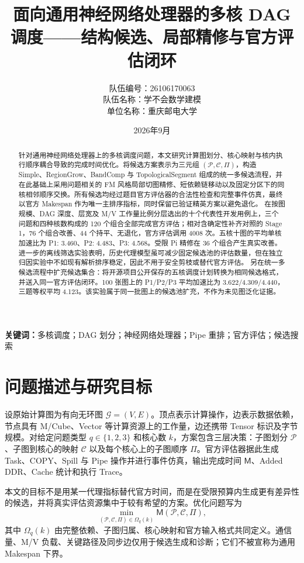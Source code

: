 \documentclass[UTF8,a4paper,11pt]{ctexart}
\title{面向通用神经网络处理器的多核 DAG 调度\quad——结构候选、局部精修与官方评估闭环}
\author{\begin{tabular}{rl}
队伍编号：&26106170063\\
队伍名称：&学不会数学建模\\
单位名称：&重庆邮电大学
\end{tabular}}
\date{2026年9月}
\newcommand{\Makespan}{\mathsf{M}}
\newcommand{\DAG}{\mathcal{G}}
\newcommand{\PP}{\mathcal{P}}
\newcommand{\CC}{\mathcal{C}}
\newcommand{\PiOrder}{\Pi}
\begin{document}
\maketitle
\begin{abstract}
针对通用神经网络处理器上的多核调度问题，本文研究计算图划分、核心映射与核内执行顺序耦合导致的完成时间优化。将候选方案表示为三元组 $(\PP,\CC,\PiOrder)$，构造 Simple、RegionGrow、BandComp 与 TopologicalSegment 组成的统一多候选流程，并在此基础上采用问题相关的 FM 风格局部切图精修、短依赖链移动以及固定分区下的同核相邻顺序交换。所有候选均经过题目官方评估器的合法性检查和完整事件仿真，最终以官方 Makespan 作为唯一主排序指标，同时保留已验证精英方案以避免退化。
在按图规模、DAG 深度、层宽及 M/V 工作量比例分层选出的十个代表性开发用例上，三个问题和四种核数构成的 120 个组合全部完成官方评估；相对含确定性补齐对照的 Stage 1，76 个组合改善、44 个持平、无退化，官方评估调用 4008 次。五核十图的平均单核加速比为 P1: 3.460、P2: 4.483、P3: 4.568。受限 Pi 精修在 36 个组合产生真实改善。进一步的离线筛选实验表明，历史代理模型虽可减少固定候选池的评估数量，但在独立归因实验中不如现有解析排序稳定，因此不用于安全剪枝或替代官方评估。
另在统一多候选流程中扩充候选集合：将开源项目公开保存的五核调度计划转换为相同候选格式，并送入同一官方评估闭环。100 张图上的 P1/P2/P3 平均加速比为 3.622/4.309/4.440，三题等权平均 4.123。该实验属于同一批图上的候选池扩充，不作为未见图泛化证据。
\end{abstract}
\noindent\textbf{关键词：}多核调度；DAG 划分；神经网络处理器；Pipe 重排；官方评估；候选搜索

\section{问题描述与研究目标}
设原始计算图为有向无环图 $\DAG=(V,E)$。顶点表示计算操作，边表示数据依赖，节点具有 M/Cube、Vector 等计算资源上的工作量，边还携带 Tensor 标识及字节规模。对给定问题类型 $q\in\{1,2,3\}$ 和核心数 $k$，方案包含三层决策：子图划分 $\PP$、子图到核心的映射 $\CC$ 以及每个核心上的子图顺序 $\PiOrder$。官方评估器据此生成 Task、COPY、Spill 与 Pipe 操作并进行事件仿真，输出完成时间 $\Makespan$、Added DDR、Cache 统计和执行 Trace。

本文的目标不是用某一代理指标替代官方时间，而是在受限预算内生成更有差异性的候选，并将真实评估资源集中于较有希望的方案。优化问题写为
\begin{equation}
    \min_{(\PP,\CC,\PiOrder)\in\Omega_q(k)} \Makespan(\PP,\CC,\PiOrder),
\end{equation}
其中 $\Omega_q(k)$ 由完整依赖、子图归属、核心映射和官方输入格式共同定义。通信量、M/V 负载、关键路径及同步边仅用于候选生成和诊断；它们不被宣称为通用 Makespan 下界。
\end{document}
